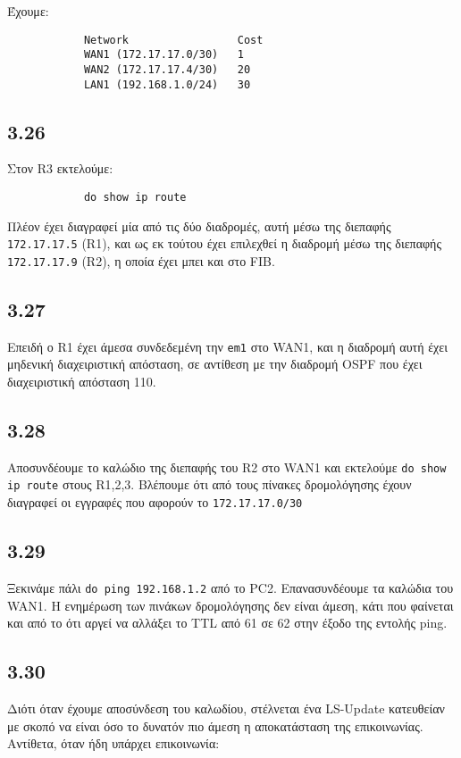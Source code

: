 \documentclass[a4paper, 12pt]{article}
\begin{document}
		Έχουμε: 
		
		\begin{verbatim}
			Network                 Cost
			WAN1 (172.17.17.0/30)   1
			WAN2 (172.17.17.4/30)   20
			LAN1 (192.168.1.0/24)   30
		\end{verbatim}

	\subsection*{3.26}
		Στον R3 εκτελούμε:
		
		\begin{verbatim}
			do show ip route
		\end{verbatim}
		
		Πλέον έχει διαγραφεί μία από τις δύο διαδρομές, αυτή μέσω της διεπαφής \verb|172.17.17.5| (R1), και ως εκ τούτου έχει επιλεχθεί η διαδρομή μέσω της διεπαφής \verb|172.17.17.9| (R2), η οποία έχει μπει και στο FIB.

	\subsection*{3.27}
		Επειδή ο R1 έχει άμεσα συνδεδεμένη την \verb|em1| στο WAN1, και η διαδρομή αυτή έχει μηδενική διαχειριστική απόσταση, σε αντίθεση με την διαδρομή OSPF που έχει διαχειριστική απόσταση 110.

	\subsection*{3.28}
		Αποσυνδέουμε το καλώδιο της διεπαφής του R2 στο WAN1 και εκτελούμε \verb|do show ip route| στους R1,2,3. Βλέπουμε ότι από τους πίνακες δρομολόγησης έχουν διαγραφεί οι εγγραφές που αφορούν το \verb|172.17.17.0/30|

	\subsection*{3.29}
		Ξεκινάμε πάλι \verb|do ping 192.168.1.2| από το PC2. Επανασυνδέουμε τα καλώδια του WAN1. Η ενημέρωση των πινάκων δρομολόγησης δεν είναι άμεση, κάτι που φαίνεται και από το ότι αργεί να αλλάξει το TTL από 61 σε 62 στην έξοδο της εντολής ping.

	\subsection*{3.30} 
		Διότι όταν έχουμε αποσύνδεση του καλωδίου, στέλνεται ένα LS-Update κατευθείαν με σκοπό να είναι όσο το δυνατόν πιο άμεση η αποκατάσταση της επικοινωνίας. Αντίθετα, όταν ήδη υπάρχει επικοινωνία:
		
\end{document}

